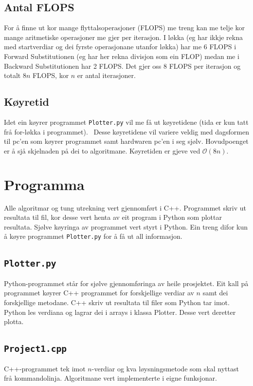 \documentclass[11pt, a4paper]{article}
\begin{document}
  \subsection{Antal FLOPS}
    For å finne ut kor mange flyttalsoperasjoner (FLOPS) me treng kan me telje kor mange 
    aritmetiske operasjoner me gjer per iterasjon. I løkka (eg har ikkje rekna med startverdiar og 
    dei fyrste operasjonane utanfor løkka) har me 6 FLOPS i Forward Substitutionen (eg har her 
    rekna divisjon som ein FLOP) medan me i Backward Substitutionen har 2 FLOPS. Det gjer oss 8 FLOPS 
    per iterasjon og totalt $8n$ FLOPS, kor $n$ er antal iterasjoner.


  \subsection{Køyretid}
    Idet ein køyrer programmet \texttt{Plotter.py} vil me få ut køyretidene (tida er kun tatt frå
    for-løkka i programmet).
     \
    Desse køyretidene vil variere veldig med dagsformen til pc'en som køyrer programmet samt
    hardwaren pc'en i seg sjølv. Hovudpoenget er å sjå skjelnaden på dei to algoritmane.
    Køyretiden er gjeve ved $\mathcal{O}(8n)$.


\newpage

\section{Programma}
  Alle algoritmar og tung utrekning vert gjennomført i C++. Programmet skriv ut resultata til fil,
  kor desse vert henta av eit program i Python som plottar resultata. Sjølve køyringa av programmet 
  vert styrt i Python. Ein treng difor kun å køyre programmet \texttt{Plotter.py} for å få ut all
  informasjon. 

  \subsection{\texttt{Plotter.py}}
    Python-programmet står for sjølve gjennomføringa av heile prosjektet. Eit kall på 
    programmet køyrer C++ programmet for forskjellige verdiar av $n$ samt dei forskjellige
    metodane. C++ skriv ut resultata til filer som Python tar imot. Python les verdiana og lagrar dei
    i arrays i klassa Plotter. Desse vert deretter plotta.
   
  \subsection{\texttt{Project1.cpp}}
    C++-programmet tek imot $n$-verdiar og kva løysningsmetode som skal nyttast frå kommandolinja.
    Algoritmane vert implementerte i eigne funksjonar.
\end{document}
